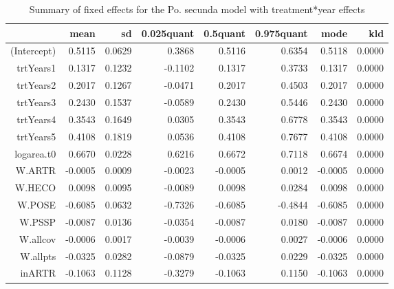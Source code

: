 \begin{table}[ht]
\centering
\caption{Summary of fixed effects for the Po. secunda model with treatment*year effects} 
\label{POSEgrowth-trtYears}
\begin{tabular}{rrrrrrrr}
  \hline
 & mean & sd & 0.025quant & 0.5quant & 0.975quant & mode & kld \\ 
  \hline
(Intercept) & 0.5115 & 0.0629 & 0.3868 & 0.5116 & 0.6354 & 0.5118 & 0.0000 \\ 
  trtYears1 & 0.1317 & 0.1232 & -0.1102 & 0.1317 & 0.3733 & 0.1317 & 0.0000 \\ 
  trtYears2 & 0.2017 & 0.1267 & -0.0471 & 0.2017 & 0.4503 & 0.2017 & 0.0000 \\ 
  trtYears3 & 0.2430 & 0.1537 & -0.0589 & 0.2430 & 0.5446 & 0.2430 & 0.0000 \\ 
  trtYears4 & 0.3543 & 0.1649 & 0.0305 & 0.3543 & 0.6778 & 0.3543 & 0.0000 \\ 
  trtYears5 & 0.4108 & 0.1819 & 0.0536 & 0.4108 & 0.7677 & 0.4108 & 0.0000 \\ 
  logarea.t0 & 0.6670 & 0.0228 & 0.6216 & 0.6672 & 0.7118 & 0.6674 & 0.0000 \\ 
  W.ARTR & -0.0005 & 0.0009 & -0.0023 & -0.0005 & 0.0012 & -0.0005 & 0.0000 \\ 
  W.HECO & 0.0098 & 0.0095 & -0.0089 & 0.0098 & 0.0284 & 0.0098 & 0.0000 \\ 
  W.POSE & -0.6085 & 0.0632 & -0.7326 & -0.6085 & -0.4844 & -0.6085 & 0.0000 \\ 
  W.PSSP & -0.0087 & 0.0136 & -0.0354 & -0.0087 & 0.0180 & -0.0087 & 0.0000 \\ 
  W.allcov & -0.0006 & 0.0017 & -0.0039 & -0.0006 & 0.0027 & -0.0006 & 0.0000 \\ 
  W.allpts & -0.0325 & 0.0282 & -0.0879 & -0.0325 & 0.0229 & -0.0325 & 0.0000 \\ 
  inARTR & -0.1063 & 0.1128 & -0.3279 & -0.1063 & 0.1150 & -0.1063 & 0.0000 \\ 
   \hline
\end{tabular}
\end{table}

